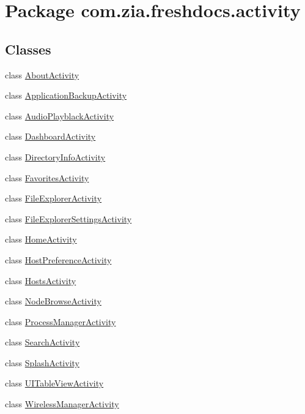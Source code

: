\hypertarget{namespacecom_1_1zia_1_1freshdocs_1_1activity}{\section{Package com.\-zia.\-freshdocs.\-activity}
\label{namespacecom_1_1zia_1_1freshdocs_1_1activity}
}
\subsection*{Classes}
\begin{DoxyCompactItemize}
\item 
class \hyperlink{classcom_1_1zia_1_1freshdocs_1_1activity_1_1_about_activity}{About\-Activity}
\item 
class \hyperlink{classcom_1_1zia_1_1freshdocs_1_1activity_1_1_application_backup_activity}{Application\-Backup\-Activity}
\item 
class \hyperlink{classcom_1_1zia_1_1freshdocs_1_1activity_1_1_audio_playblack_activity}{Audio\-Playblack\-Activity}
\item 
class \hyperlink{classcom_1_1zia_1_1freshdocs_1_1activity_1_1_dashboard_activity}{Dashboard\-Activity}
\item 
class \hyperlink{classcom_1_1zia_1_1freshdocs_1_1activity_1_1_directory_info_activity}{Directory\-Info\-Activity}
\item 
class \hyperlink{classcom_1_1zia_1_1freshdocs_1_1activity_1_1_favorites_activity}{Favorites\-Activity}
\item 
class \hyperlink{classcom_1_1zia_1_1freshdocs_1_1activity_1_1_file_explorer_activity}{File\-Explorer\-Activity}
\item 
class \hyperlink{classcom_1_1zia_1_1freshdocs_1_1activity_1_1_file_explorer_settings_activity}{File\-Explorer\-Settings\-Activity}
\item 
class \hyperlink{classcom_1_1zia_1_1freshdocs_1_1activity_1_1_home_activity}{Home\-Activity}
\item 
class \hyperlink{classcom_1_1zia_1_1freshdocs_1_1activity_1_1_host_preference_activity}{Host\-Preference\-Activity}
\item 
class \hyperlink{classcom_1_1zia_1_1freshdocs_1_1activity_1_1_hosts_activity}{Hosts\-Activity}
\item 
class \hyperlink{classcom_1_1zia_1_1freshdocs_1_1activity_1_1_node_browse_activity}{Node\-Browse\-Activity}
\item 
class \hyperlink{classcom_1_1zia_1_1freshdocs_1_1activity_1_1_process_manager_activity}{Process\-Manager\-Activity}
\item 
class \hyperlink{classcom_1_1zia_1_1freshdocs_1_1activity_1_1_search_activity}{Search\-Activity}
\item 
class \hyperlink{classcom_1_1zia_1_1freshdocs_1_1activity_1_1_splash_activity}{Splash\-Activity}
\item 
class \hyperlink{classcom_1_1zia_1_1freshdocs_1_1activity_1_1_u_i_table_view_activity}{U\-I\-Table\-View\-Activity}
\item 
class \hyperlink{classcom_1_1zia_1_1freshdocs_1_1activity_1_1_wireless_manager_activity}{Wireless\-Manager\-Activity}
\end{DoxyCompactItemize}
